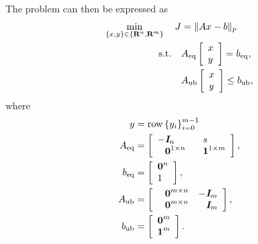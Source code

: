 \documentclass{article}
\begin{document}
    The problem can then be expressed as
    \begin{align*}
        \min_{\{x,y\}\in\{\textbf{R}^n,\textbf{R}^{m}\}}\quad J &= \|Ax-b\|_p\\
        \text{s.t.} \quad 
        &A_{\text{eq}} \left[\begin{array}{l}
            x\\
            y
        \end{array}\right] = b_{\text{eq}},\\
        &A_{\text{ub}} \left[\begin{array}{l}
            x\\
            y
        \end{array}\right] \leq b_{\text{ub}},
    \end{align*}
    where
    \begin{align*}
        y &= \row\left\{y_i\right\}_{i=0}^{m-1}\\
        A_\eq & =
        \left[
            \begin{array}{llll}
                    -\eye_n 
                &
                    \minus s
                \\
                    \minus \zeros^{1\times n}
                &
                    \minus \ones^{1\times m}
            \end{array}
        \right],\\
        b_\eq & =
        \left[
            \begin{array}{l}
                    \zeros^n\\
                    1
            \end{array}
        \right],\\
        A_\ub & =
        \left[
            \begin{array}{llll}
                    \minus \zeros^{m\times n} 
                &
                    -\eye_{m}
                \\
                    \minus \zeros^{m\times n} 
                &
                    \minus \eye_{m}
            \end{array}
        \right],\\
        b_\ub & =
        \left[
            \begin{array}{l}
                    \zeros^{m}\\
                    \ones^{m}
            \end{array}
        \right].
    \end{align*}
\end{document}
